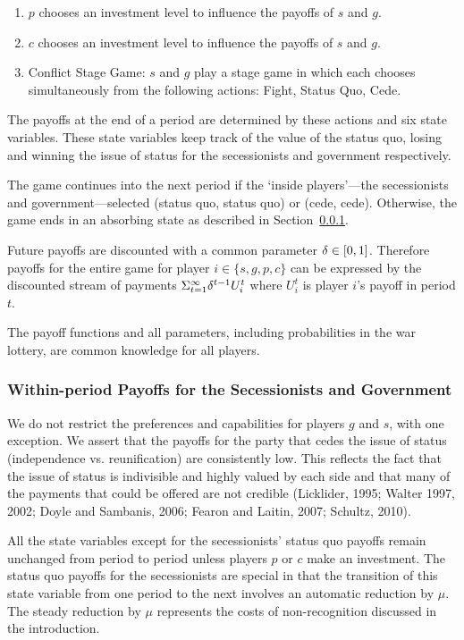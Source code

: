 \begin{enumerate} 
\item $p$ chooses an investment level to influence the payoffs of $s$ and $g$. 
 
\item $c$ chooses an investment level to influence the payoffs of $s$ and $g$.
 
\item Conflict Stage Game: $s$ and $g$ play a stage game in which each chooses simultaneously from the following actions: Fight, Status Quo, Cede. 
\end{enumerate}

The payoffs at the end of a period are determined by these actions and six state variables. These state variables keep track of the value of the status quo, losing and winning the issue of status for the secessionists and government respectively. 

The game continues into the next period if the `inside players'---the secessionists and government---selected (status quo, status quo) or (cede, cede). Otherwise, the game ends in an absorbing state as described in Section~\ref{sec:stage}.

Future payoffs are discounted with a common parameter $\delta \in [0,1]$. Therefore payoffs for the entire game for player $i\in \{s, g, p, c\} $ can be expressed by the discounted stream of payments $\Sigma_{t=1}^{\infty} \delta^{t-1} U_i^t $ where $U_i^t$ is player $i$'s payoff in period $t$.

The payoff functions and all parameters, including probabilities in the war lottery, are common knowledge for all players.


\subsubsection{Within-period Payoffs for the Secessionists and Government}
\label{sec:stage}

We do not restrict the preferences and capabilities for players $g$ and $s$, with one exception. We assert that the payoffs for the party that cedes the issue of status (independence vs. reunification) are consistently low. This reflects the fact that the issue of status is indivisible and highly valued by each side and that many of the payments that could be offered are not credible (Licklider, 1995; Walter 1997, 2002; Doyle and Sambanis, 2006; Fearon and Laitin, 2007; Schultz, 2010).

All the state variables except for the secessionists' status quo payoffs remain unchanged from period to period unless players $p$ or $c$ make an investment. The status quo payoffs for the secessionists are special in that the transition of this state variable from one period to the next involves an automatic reduction by $\mu$. The steady reduction by $\mu$ represents the costs of non-recognition discussed in the introduction.


